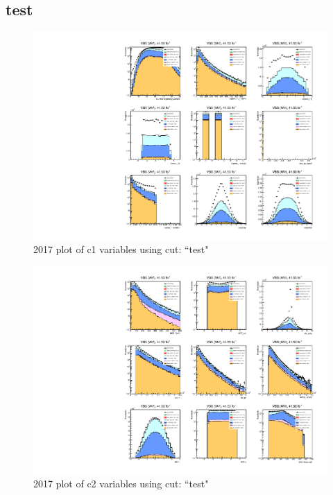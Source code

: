 \documentclass{article}
\begin{document}
      \subsection*{test}
                        \begin{figure}[H]
                            \centering
                            \caption{2017 plot of c1 variables using cut: ``test"}
                            \includegraphics[width=\textwidth]{2017/c1_2017_test.pdf}
                        \end{figure}    
                        \begin{figure}[H]
                            \centering
                            \caption{2017 plot of c2 variables using cut: ``test"}
                            \includegraphics[width=\textwidth]{2017/c2_2017_test.pdf}
                        \end{figure}    
\end{document}
